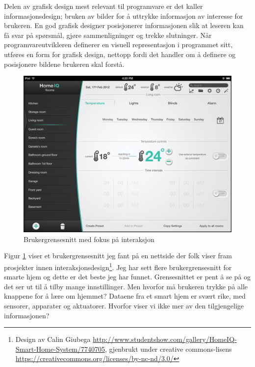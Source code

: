 Delen av grafisk design mest relevant til programvare er det \citet{tufte01} kaller informasjonsdesign; bruken av bilder for å uttrykke informasjon av interesse for brukeren. En god grafisk designer posisjonerer informasjonen slik at leseren kan få svar på spørsmål, gjøre sammenligninger og trekke slutninger. Når programvareutvikleren definerer en visuell representasjon i programmet sitt, utføres en form for grafisk design, nettopp fordi det handler om å definere og posisjonere bildene brukeren skal forstå.
\begin{figure}
\centering
\includegraphics[scale=1.25]{fig/typical_ui_homeiq}
\caption{Brukergrensesnitt med fokus på interaksjon}
\label{fig:homeiq}
\end{figure}
Figur \ref{fig:homeiq} viser et brukergrensesnitt jeg fant på en nettside der folk viser fram prosjekter innen interaksjonsdesign\footnote{Design av Calin Giubega \url{http://www.studentshow.com/gallery/HomeIQ-Smart-Home-System/7740705}, gjenbrukt under creative commons-lisens \url{https://creativecommons.org/licenses/by-nc-nd/3.0/}}. Jeg har sett flere brukergrensesnitt for smarte hjem og dette er det beste jeg har funnet. Grensesnittet er pent å se på og det ser ut til å tilby mange innstillinger. Men hvorfor må brukeren trykke på alle knappene for å lære om hjemmet? Dataene fra et smart hjem er svært rike, med sensorer, apparater og aktuatorer. Hvorfor viser vi ikke mer av den tilgjengelige informasjonen?

